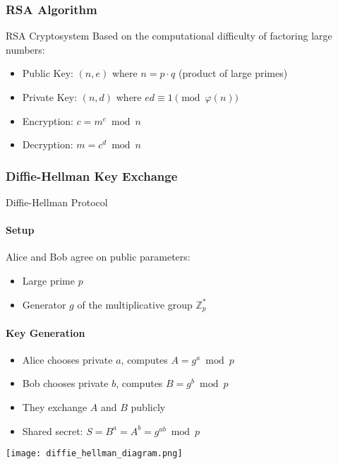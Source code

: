 \subsubsection{RSA Algorithm}

\begin{definition}{RSA Cryptosystem}
    Based on the computational difficulty of factoring large numbers:
    \begin{itemize}
        \item Public Key: $(n, e)$ where $n = p \cdot q$ (product of large primes)
        \item Private Key: $(n, d)$ where $ed \equiv 1 \pmod{\varphi(n)}$
        \item Encryption: $c = m^e \bmod n$
        \item Decryption: $m = c^d \bmod n$
    \end{itemize}
\end{definition}

\subsubsection{Diffie-Hellman Key Exchange}

\begin{KR}{Diffie-Hellman Protocol}
    \paragraph{Setup}
    Alice and Bob agree on public parameters:
    \begin{itemize}
        \item Large prime $p$
        \item Generator $g$ of the multiplicative group $\mathbb{Z}_p^*$
    \end{itemize}
    
    \paragraph{Key Generation}
    \begin{itemize}
        \item Alice chooses private $a$, computes $A = g^a \bmod p$
        \item Bob chooses private $b$, computes $B = g^b \bmod p$
        \item They exchange $A$ and $B$ publicly
        \item Shared secret: $S = B^a = A^b = g^{ab} \bmod p$
    \end{itemize}
    \texttt{[image: diffie\_hellman\_diagram.png]}
\end{KR}

